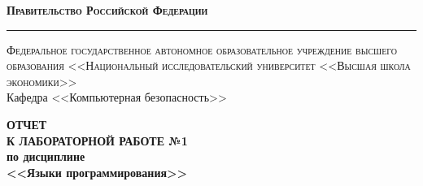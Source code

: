 \documentclass[a4paper,12pt]{article}
\begin{document}
		
\begin{titlepage}		

\begin{center}
	\textsc{\textbf{Правительство Российской Федерации}}\\
	\vspace{0.5cm}
	\hrule
	\vspace{0.5cm}
	\textsc{Федеральное государственное автономное образовательное учреждение высшего образования <<Национальный исследовательский университет <<Высшая школа экономики>>}\\
	\vspace{1cm}
	Кафедра <<Компьютерная безопасность>>
\end{center}	

\vspace{\fill}

\begin{center}
	\Large{\textbf{ОТЧЕТ \\ К ЛАБОРАТОРНОЙ РАБОТЕ №1}} \\
	\vspace{1em}
	\textbf{по дисциплине} \\
	\vspace{1em}
	\large{\textbf{<<Языки программирования>>}}
\end{center}

\vspace{\fill}


\end{titlepage}
\end{document}
